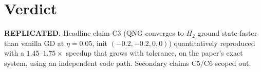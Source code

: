 \documentclass[11pt]{article}
\begin{document}
\section{Verdict}
\textbf{REPLICATED.} Headline claim C3 (QNG converges to $H_2$ ground state faster than vanilla
GD at $\eta=0.05$, init $(-0.2,-0.2,0,0)$) quantitatively reproduced with a $1.45$--$1.75\times$
speedup that grows with tolerance, on the paper's exact system, using an independent code path.
Secondary claims C5/C6 scoped out.


\end{document}

